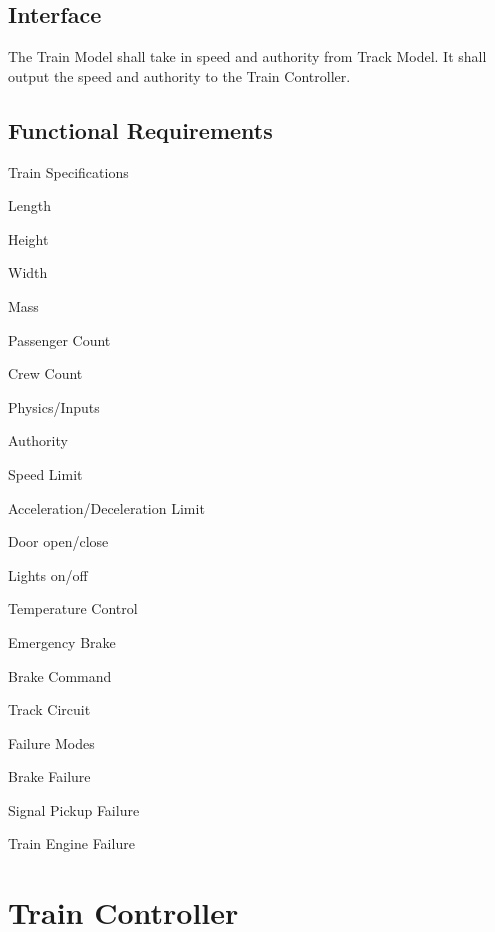 \documentclass{scrreprt}
\begin{document}
\subsection{Interface}
The Train Model shall take in speed and authority from Track Model. It shall
output the speed and authority to the Train Controller.

\subsection{Functional Requirements}
\begin{numonly}
  \item Train Specifications
   \begin{numonly}
    \item Length
    \item Height
    \item Width
    \item Mass
    \item Passenger Count
    \item Crew Count
   \end{numonly}
  \item Physics/Inputs
  \begin{numonly}
   \item Authority
   \item Speed Limit
   \item Acceleration/Deceleration Limit
   \item Door open/close
   \item Lights on/off
   \item Temperature Control
   \item Emergency Brake
   \item Brake Command
   \item Track Circuit
  \end{numonly}
  \item Failure Modes
    \begin{numonly}
     \item Brake Failure
     \item Signal Pickup Failure
     \item Train Engine Failure
    \end{numonly}
\end{numonly}


\section{Train Controller}
\end{document}
